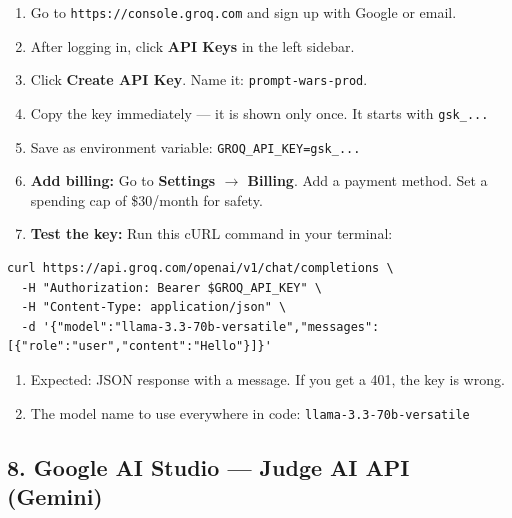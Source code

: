\documentclass[11pt, a4paper]{article}
\begin{document}
\begin{tcolorbox}[phasebox=infopurple, title={Step-by-Step: Groq API Key Setup}]
\begin{enumerate}[leftmargin=1cm, itemsep=3pt]
    \item Go to \texttt{https://console.groq.com} and sign up with Google or email.
    \item After logging in, click \textbf{API Keys} in the left sidebar.
    \item Click \textbf{Create API Key}. Name it: \texttt{prompt-wars-prod}.
    \item Copy the key immediately --- it is shown only once. It starts with \texttt{gsk\_...}
    \item Save as environment variable: \texttt{GROQ\_API\_KEY=gsk\_...}
    \item \textbf{Add billing:} Go to \textbf{Settings $\to$ Billing}. Add a payment method. Set a spending cap of \$30/month for safety.
    \item \textbf{Test the key:} Run this cURL command in your terminal:
\end{enumerate}
\begin{lstlisting}[style=shell]
curl https://api.groq.com/openai/v1/chat/completions \
  -H "Authorization: Bearer $GROQ_API_KEY" \
  -H "Content-Type: application/json" \
  -d '{"model":"llama-3.3-70b-versatile","messages":[{"role":"user","content":"Hello"}]}'
\end{lstlisting}
\begin{enumerate}[leftmargin=1cm, itemsep=3pt, start=8]
    \item Expected: JSON response with a message. If you get a 401, the key is wrong.
    \item The model name to use everywhere in code: \texttt{llama-3.3-70b-versatile}
\end{enumerate}
\end{tcolorbox}

\subsection{8. Google AI Studio --- Judge AI API (Gemini)}
\end{document}
